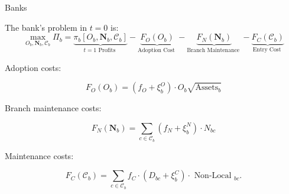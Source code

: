 \documentclass[notes,10pt, aspectratio=169]{beamer}
\newenvironment{wideitemize}{\itemize\addtolength{\itemsep}{10pt}}{\enditemize}
\begin{document}
\begin{frame}{Banks}

    \begin{wideitemize}
        \item The bank's problem in $t=0$ is:
        $$
\max _{O_b, \boldsymbol{N}_b, \mathcal{C}_b} \Pi_b=\underbrace{\pi_b\left[O_b, \boldsymbol{N}_b, \mathcal{C}_b\right]}_{t=1 \text { Profits }}-\underbrace{F_O\left(O_b\right)}_{\text {Adoption Cost }}-\underbrace{F_N\left(\boldsymbol{N}_b\right)}_{\text {Branch Maintenance }}-\underbrace{F_C\left(\mathcal{C}_b\right)}_{\text {Entry Cost }}
    $$



    \item Adoption costs:


$$
F_O\left(O_b\right)=\left(f_O+\xi_b^O\right) \cdot O_b \sqrt{\operatorname{Assets}_b}
$$




\item Branch maintenance costs:

$$
F_N\left(\boldsymbol{N}_b\right)=\sum_{c \in \mathcal{C}_b}\left(f_N+\xi_b^N\right) \cdot N_{b c}
$$

\item Maintenance costs:


$$
F_C\left(\mathcal{C}_b\right)=\sum_{c \in \mathcal{C}_b} f_C \cdot\left(D_{b c}+\xi_b^C\right) \cdot \text { Non-Local }_{b c} .
$$

    
\end{wideitemize}

\end{frame}
\end{document}
